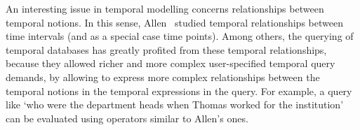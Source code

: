 

An interesting issue in temporal modelling concerns relationships between temporal notions. In this sense, Allen~\cite{Allen1983} studied temporal relationships between time intervals (and as a special case time points). Among others, the querying of temporal databases has greatly profited from these temporal relationships, because they allowed richer and more complex user-specified temporal query demands, by allowing to express more complex relationships between the temporal notions in the temporal expressions in the query. For example, a query like `who were the department heads when Thomas worked for the institution' can be evaluated using operators similar to Allen's ones.

